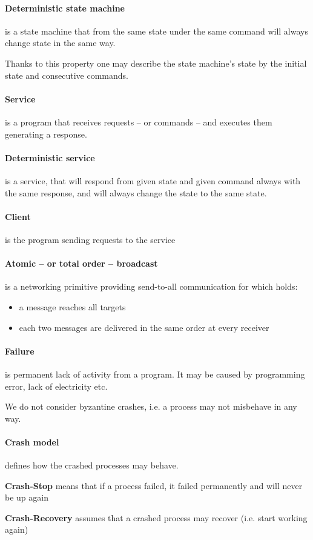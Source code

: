 \paragraph{Deterministic state machine}
is a state machine that from the same state under the same command will always change state in the same way.

Thanks to this property one may describe the state machine's state by the initial state and consecutive commands. 

\paragraph{Service}
is a program that receives requests -- or commands -- and executes them generating a response.

\paragraph{Deterministic service}
is a service, that will respond from given state and given command always with the same response, and will always change the state to the same state.

\paragraph{Client}
is the program sending requests to the service

\paragraph{Atomic -- or total order -- broadcast}
is a networking primitive providing send-to-all communication for which holds:
\begin{itemize}
 \item a message reaches all targets
 \item each two messages are delivered in the same order at every receiver
\end{itemize}

\paragraph{Failure}
is permanent lack of activity from a program. It may be caused by programming error, lack of electricity etc.

We do not consider byzantine crashes, i.e. a process may not misbehave in any way.

\paragraph{Crash model}
defines how the crashed processes may behave.
\begin{list}{}{ \setlength{\leftmargin}{0.2\textwidth} \setlength{\itemindent}{-0.1\textwidth}}
 \item[\textbf{Crash-Stop}] means that if a process failed, it failed permanently and will never be up again
 \item[\textbf{Crash-Recovery}] assumes that a crashed process may recover (i.e. start working again)
\end{list}

